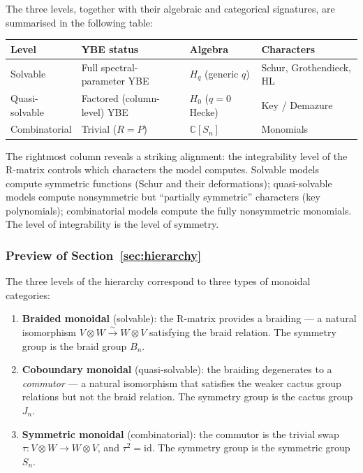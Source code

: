 The three levels, together with their algebraic and categorical
signatures, are summarised in the following table:

\begin{center}
\renewcommand{\arraystretch}{1.4}
\begin{tabular}{llll}
\toprule
\textbf{Level} & \textbf{YBE status} & \textbf{Algebra} & \textbf{Characters} \\
\midrule
Solvable & Full spectral-parameter YBE &
  $H_q$ (generic $q$) &
  Schur, Grothendieck, HL \\
Quasi-solvable & Factored (column-level) YBE &
  $H_0$ ($q = 0$ Hecke) &
  Key / Demazure \\
Combinatorial & Trivial ($R = P$) &
  $\mathbb{C}[S_n]$ &
  Monomials \\
\bottomrule
\end{tabular}
\end{center}

\noindent
The rightmost column reveals a striking alignment: the integrability
level of the R-matrix controls which characters the model computes.
Solvable models compute symmetric functions (Schur and their
deformations); quasi-solvable models compute nonsymmetric but
``partially symmetric'' characters (key polynomials); combinatorial
models compute the fully nonsymmetric monomials.  The level of
integrability is the level of symmetry.

\subsubsection*{Preview of Section~\ref{sec:hierarchy}}

The three levels of the hierarchy correspond to three types of
monoidal categories:
\begin{enumerate}
\item \textbf{Braided monoidal} (solvable): the R-matrix provides a
  braiding --- a natural isomorphism $V \otimes W \xrightarrow{\sim}
  W \otimes V$ satisfying the braid relation.  The symmetry group is
  the braid group $B_n$.
\item \textbf{Coboundary monoidal} (quasi-solvable): the braiding
  degenerates to a \emph{commutor} --- a natural isomorphism that
  satisfies the weaker cactus group relations but not the braid
  relation.  The symmetry group is the cactus group $J_n$.
\item \textbf{Symmetric monoidal} (combinatorial): the commutor is
  the trivial swap $\tau \colon V \otimes W \to W \otimes V$, and
  $\tau^2 = \mathrm{id}$.  The symmetry group is the symmetric group
  $S_n$.
\end{enumerate}

